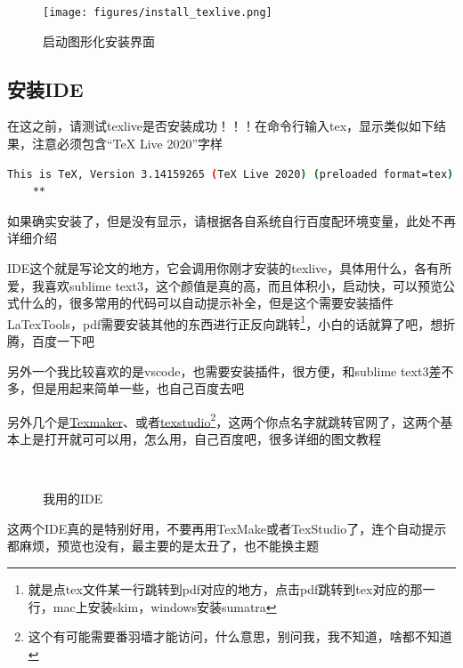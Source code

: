 \documentclass[AutoFakeBold]{LZUThesis2007}
\begin{document}
\begin{figure}[H]
    \centering
    \texttt{[image: figures/install\_texlive.png]}
    \caption{启动图形化安装界面}
    \label{fig_install_texlive}
\end{figure}





\subsection{安装IDE} %
\label{sub:安装ide}

在这之前，请测试texlive是否安装成功！！！在命令行输入tex，显示类似如下结果，注意必须包含“TeX Live 2020”字样

\begin{lstlisting}[language=bash]
    This is TeX, Version 3.14159265 (TeX Live 2020) (preloaded format=tex)
    **
\end{lstlisting}


如果确实安装了，但是没有显示，请根据各自系统自行百度配环境变量，此处不再详细介绍


IDE这个就是写论文的地方，它会调用你刚才安装的texlive，具体用什么，各有所爱，我喜欢sublime text3，这个颜值是真的高，而且体积小，启动快，可以预览公式什么的，很多常用的代码可以自动提示补全，但是这个需要安装插件LaTexTools，pdf需要安装其他的东西进行正反向跳转\footnote{就是点tex文件某一行跳转到pdf对应的地方，点击pdf跳转到tex对应的那一行，mac上安装skim，windows安装sumatra}，小白的话就算了吧，想折腾，百度一下吧


另外一个我比较喜欢的是vscode，也需要安装插件，很方便，和sublime text3差不多，但是用起来简单一些，也自己百度去吧

另外几个是\href{https://www.xm1math.net/texmaker}{Texmaker}、或者\href{http://texstudio.sourceforge.net/}{texstudio}\footnote{这个有可能需要番羽墙才能访问，什么意思，别问我，我不知道，啥都不知道}，这两个你点名字就跳转官网了，这两个基本上是打开就可可以用，怎么用，自己百度吧，很多详细的图文教程


\begin{figure}[H]
	\centering
	\qquad
	\\
    \caption{我用的IDE}
    \label{fig_ide}
\end{figure}

这两个IDE真的是特别好用，不要再用TexMake或者TexStudio了，连个自动提示都麻烦，预览也没有，最主要的是太丑了，也不能换主题
\end{document}
